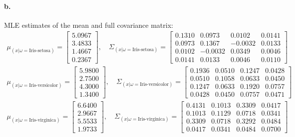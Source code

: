 \documentclass[a4paper]{article}
\begin{document}
\paragraph{b.} MLE estimates of the mean and full covariance matrix: \\
\begin{align*}
	\mu_{(x|\omega=\text{Iris-setosa})} = \begin{bmatrix}
		5.0967\\
	    3.4833\\
	    1.4667\\
	    0.2367
	\end{bmatrix}, \quad
	\Sigma_{(x|\omega=\text{Iris-setosa})} = \begin{bmatrix}
	0.1310  &  0.0973  &  0.0102  &  0.0141\\
    0.0973  &  0.1367  & -0.0032  &  0.0133\\
    0.0102  & -0.0032  &  0.0349  &  0.0046\\
    0.0141  &  0.0133  &  0.0046  &  0.0110
	\end{bmatrix}
\end{align*}
\begin{align*}
	\mu_{(x|\omega=\text{Iris-versicolor})} = \begin{bmatrix}
		5.9800\\
	    2.7500\\
    	4.3000\\
	    1.3400
	\end{bmatrix}, \quad
	\Sigma_{(x|\omega=\text{Iris-versicolor})} = \begin{bmatrix}
	0.1936  &  0.0510  &  0.1247  &  0.0428\\
    0.0510  &  0.1058  &  0.0633  &  0.0450\\
    0.1247  &  0.0633  &  0.1920  &  0.0757\\
    0.0428  &  0.0450  &  0.0757  &  0.0471
	\end{bmatrix}
\end{align*}
\begin{align*}
	\mu_{(x|\omega=\text{Iris-virginica})} = \begin{bmatrix}
		6.6400\\
	    2.9667\\
	    5.5533\\
	    1.9733
	\end{bmatrix}, \quad
	\Sigma_{(x|\omega=\text{Iris-virginica})} = \begin{bmatrix}
	0.4131  &  0.1013  &  0.3309  &  0.0417\\
    0.1013  &  0.1129  &  0.0718  &  0.0341\\
    0.3309  &  0.0718  &  0.3292  &  0.0484\\
    0.0417  &  0.0341  &  0.0484  &  0.0700
	\end{bmatrix}
\end{align*}
\end{document}
